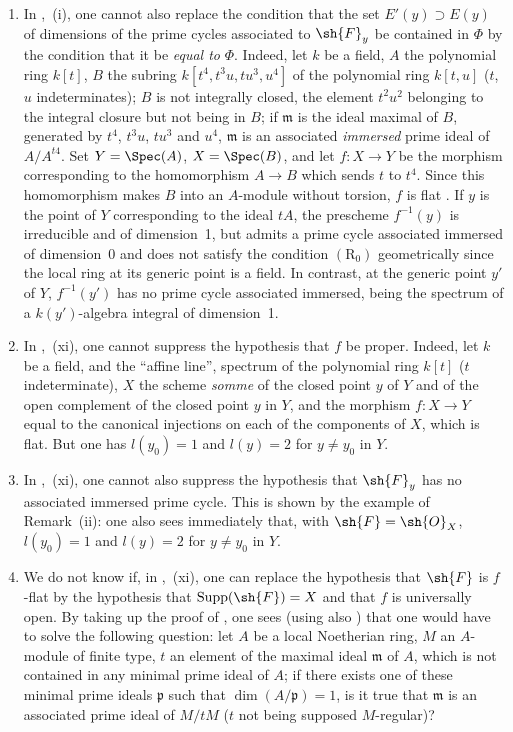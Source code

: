 \begin{remarks}[12.2.3]
\begin{enumerate}[label=(\roman*)]
  \item In ,~(i), one cannot also replace the condition that the set $E'(y)\supset E(y)$ of dimensions of the prime cycles associated to $\sh{F}_y$ be contained in $\Phi$ by the condition that it be \emph{equal to} $\Phi$.
Indeed, let $k$ be a field, $A$ the polynomial ring $k[t]$, $B$ the subring $k[t^4,t^3u,tu^3,u^4]$ of the polynomial ring $k[t,u]$ ($t$, $u$ indeterminates); $B$ is not integrally closed, the element $t^2u^2$ belonging to the integral closure but not being in $B$; if $\mathfrak{m}$ is the ideal maximal of $B$, generated by $t^4$, $t^3u$, $tu^3$ and $u^4$, $\mathfrak{m}$ is an associated \emph{immersed} prime ideal of $A/A^{t4}$.
Set $Y=\Spec(A)$, $X=\Spec(B)$, and let $f:X\to Y$ be the morphism corresponding to the homomorphism $A\to B$ which sends $t$ to $t^4$.
Since this homomorphism makes $B$ into an $A$-module without torsion, $f$ is flat .
If $y$ is the point of $Y$ corresponding to the ideal $tA$, the prescheme $f^{-1}(y)$ is irreducible and of dimension~1, but admits a prime cycle associated immersed of dimension~0 and does not satisfy the condition $(\mathrm{R}_0)$ geometrically since the local ring at its generic point is a field.
In contrast, at the generic point $y'$ of $Y$, $f^{-1}(y')$ has no prime cycle associated immersed, being the spectrum of a $k(y')$-algebra integral of dimension~1.

  \item In ,~(xi), one cannot suppress the hypothesis that $f$ be proper.
Indeed, let $k$ be a field, and the ``affine line'', spectrum of the polynomial ring $k[t]$ ($t$ indeterminate), $X$ the scheme \emph{somme} of the closed point $y$ of $Y$ and of the open complement of the closed point $y$ in $Y$, and the morphism $f:X\to Y$ equal to the canonical injections on each of the components of $X$, which is flat.
But one has $l(y_0)=1$ and $l(y)=2$ for $y\neq y_0$ in $Y$.

  \item In ,~(xi), one cannot also suppress the hypothesis that $\sh{F}_y$ has no associated immersed prime cycle.
This is shown by the example of Remark~(ii): one also sees immediately that, with $\sh{F}=\sh{O}_X$, $l(y_0)=1$ and $l(y)=2$ for $y\neq y_0$ in $Y$.

  \item We do not know if, in ,~(xi), one can replace the hypothesis that $\sh{F}$ is $f$-flat by the hypothesis that $\operatorname{Supp}(\sh{F})=X$ and that $f$ is universally open.
By taking up the proof of , one sees (using also ) that one would have to solve the following question: let $A$ be a local Noetherian ring, $M$ an $A$-module of finite type,
$t$ an element of the maximal ideal $\mathfrak{m}$ of $A$, which is not contained in any minimal prime ideal of $A$; if there exists one of these minimal prime ideals $\mathfrak{p}$ such that $\dim(A/\mathfrak{p})=1$, is it true that $\mathfrak{m}$ is an associated prime ideal of $M/tM$ ($t$ not being supposed $M$-regular)?


\end{enumerate}
\end{remarks}

